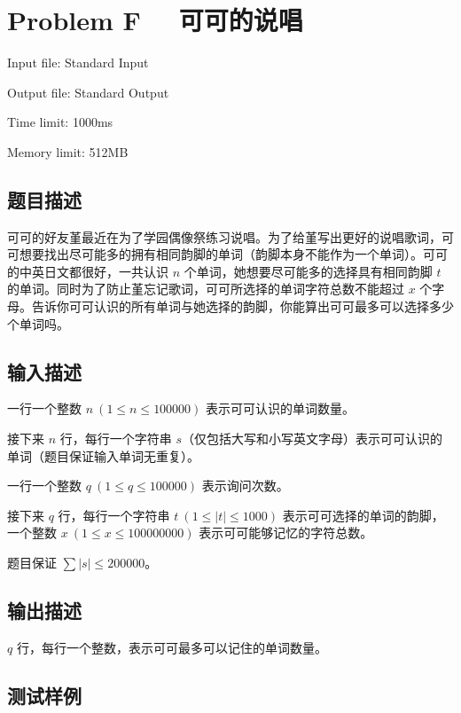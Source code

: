 \newpage
\section{Problem F \ \ 可可的说唱}
{ \limitfont{}
Input file: Standard Input \par
Output file: Standard Output \par
Time limit: 1000ms \par
Memory limit: 512MB \par
}
\subsection*{题目描述}
可可的好友堇最近在为了学园偶像祭练习说唱。为了给堇写出更好的说唱歌词，可可想要找出尽可能多的拥有相同韵脚的单词（韵脚本身不能作为一个单词）。可可的中英日文都很好，一共认识 $n$ 个单词，她想要尽可能多的选择具有相同韵脚 $t$ 的单词。同时为了防止堇忘记歌词，可可所选择的单词字符总数不能超过 $x$ 个字母。告诉你可可认识的所有单词与她选择的韵脚，你能算出可可最多可以选择多少个单词吗。
\subsection*{输入描述}

一行一个整数 $n \ ( 1 \le n \le 100000)$ 表示可可认识的单词数量。

接下来 $n$ 行，每行一个字符串 $s$（仅包括大写和小写英文字母）表示可可认识的单词（题目保证输入单词无重复）。

一行一个整数 $q \ (1 \le q \le 100000)$ 表示询问次数。

接下来 $q$ 行，每行一个字符串 $t \ ( 1 \le |t| \le 1000)$ 表示可可选择的单词的韵脚，一个整数 $x \ (1 \le x \le 100000000)$ 表示可可能够记忆的字符总数。

题目保证 $\sum |s| \le 200000$。

\subsection*{输出描述}

$q$ 行，每行一个整数，表示可可最多可以记住的单词数量。

\subsection*{测试样例}


